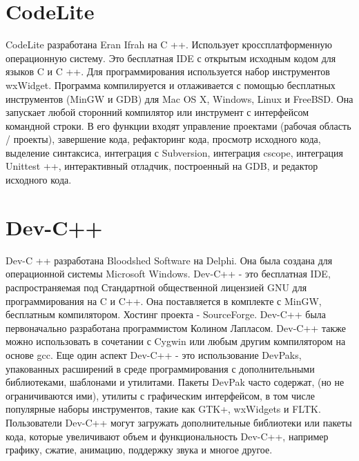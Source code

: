 \section{CodeLite}
CodeLite разработана Eran Ifrah на C ++. Использует кроссплатформенную операционную систему. Это 
бесплатная IDE с открытым исходным кодом для языков C и C ++. Для программирования используется 
набор инструментов wxWidget. Программа компилируется и отлаживается с помощью бесплатных 
инструментов (MinGW и GDB) для Mac OS X, Windows, Linux и FreeBSD. Она запускает любой сторонний 
компилятор или инструмент с интерфейсом командной строки. В его функции входят управление проектами
(рабочая область / проекты), завершение кода, рефакторинг кода, просмотр исходного кода, выделение
синтаксиса, интеграция с Subversion, интеграция cscope, интеграция Unittest ++, интерактивный 
отладчик, построенный на GDB, и редактор исходного кода.\\

\section{Dev-C++}
Dev-C ++ разработана Bloodshed Software на Delphi. Она была создана для операционной системы 
Microsoft Windows. Dev-C++ - это бесплатная IDE, распространяемая под Стандартной 
общественной лицензией GNU для программирования на C и C++. Она поставляется в комплекте с MinGW,
бесплатным компилятором. Хостинг проекта - SourceForge. Dev-C++ была первоначально разработана
программистом Колином Лапласом. Dev-C++ также можно использовать в сочетании с Cygwin или любым 
другим компилятором на основе gcc. Еще один аспект Dev-C++ - это использование DevPaks, упакованных
расширений в среде программирования с дополнительными библиотеками, шаблонами и утилитами. Пакеты 
DevPak часто содержат, (но не ограничиваются ими), утилиты с графическим интерфейсом, в том числе
популярные наборы инструментов, такие как GTK+, wxWidgets и FLTK. Пользователи Dev-C++ могут 
загружать дополнительные библиотеки или пакеты кода, которые увеличивают объем и функциональность 
Dev-C++, например графику, сжатие, анимацию, поддержку звука и многое другое.\\

